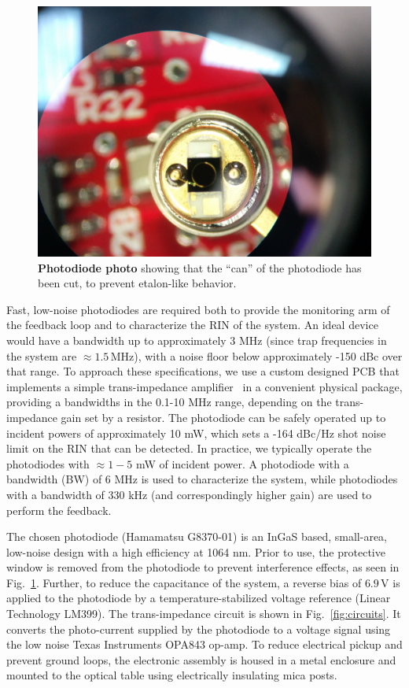 \documentclass[twocolumn,aps,pra,showpacs,preprintnumbers,bibnotes]{revtex4-1}
\begin{document}
\begin{figure}
  \begin{center}
    \includegraphics[width=\columnwidth]{fig/cut_photodiode.jpg}
    \caption{\textbf{Photodiode photo} showing that the ``can'' of the photodiode has been cut, to prevent etalon-like behavior.}\label{fig:cut_pd}
  \end{center}
\end{figure}

Fast, low-noise photodiodes are required both to provide the monitoring arm of the feedback loop and to characterize the RIN of the system.
An ideal device would have a bandwidth up to approximately 3 MHz (since trap frequencies in the system are $\approx1.5\,$MHz), with a noise floor below approximately -150 dBc over that range.
To approach these specifications, we use a custom designed PCB that implements a simple trans-impedance amplifier~\cite{Graeme1995} in a convenient physical package, providing a bandwidths in the 0.1-10 MHz range, depending on the trans-impedance gain set by a resistor.
The photodiode can be safely operated up to incident powers of approximately 10 mW, which sets a -164 dBc/Hz shot noise limit on the RIN that can be detected.
In practice, we typically operate the photodiodes with $\approx 1-5$ mW of incident power.
A photodiode with a bandwidth (BW) of 6 MHz is used to characterize the system, while photodiodes with a bandwidth of 330 kHz (and correspondingly higher gain) are used to perform the feedback.

The chosen photodiode (Hamamatsu G8370-01) is an InGaS based, small-area, low-noise design with a high efficiency at 1064 nm.
Prior to use, the protective window is removed from the photodiode to prevent interference effects, as seen in Fig.~\ref{fig:cut_pd}.
Further, to reduce the capacitance of the system, a reverse bias of $6.9\,$V is applied to the photodiode by a temperature-stabilized voltage reference (Linear Technology LM399).
The trans-impedance circuit is shown in Fig.~\ref{fig:circuits}.
It converts the photo-current supplied by the photodiode to a voltage signal using the low noise Texas Instruments OPA843 op-amp.
To reduce electrical pickup and prevent ground loops, the electronic assembly is housed in a metal enclosure and mounted to the optical table using electrically insulating mica posts.
\end{document}
